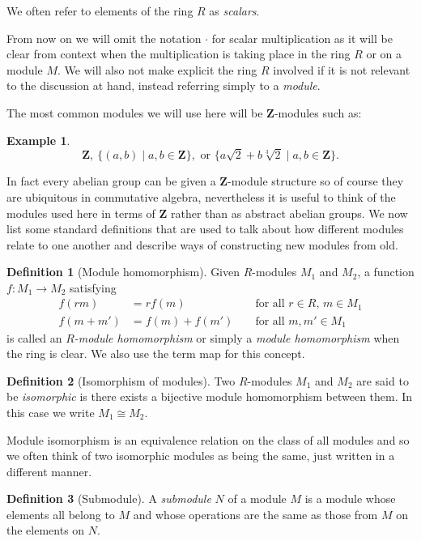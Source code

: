 \documentclass[12pt,a4paper,abstracton,bibtotoc]{scrreprt}
\theoremstyle{definition}
\newtheorem{defn}{Definition}
\newtheorem{ex}{Example}
\newcommand{\ZZ}{\mathbf{Z}}
\begin{document}
We often refer to elements of the ring $R$ as \emph{scalars}.

From now on we will omit the notation $\cdot$ for scalar multiplication as it will be clear from context when the multiplication is taking place in the ring $R$ or on a module $M$.
We will also not make explicit the ring $R$ involved if it is not relevant to the discussion at hand, instead referring simply to a \emph{module}.

The most common modules we will use here will be $\ZZ$-modules such as:
\begin{ex}
\[
\ZZ,\ \{(a,b)\mid a,b\in \ZZ\},\text{ or }\{a\sqrt{2} + b\sqrt[3]{2}\mid a,b\in \ZZ\}.
\]
\end{ex}
In fact every abelian group can be given a $\ZZ$-module structure so of course they are ubiquitous in commutative algebra, nevertheless it is useful to think of the modules used here in terms of $\ZZ$ rather than as abstract abelian groups.
We now list some standard definitions that are used to talk about how different modules relate to one another and describe ways of constructing new modules from old.

\begin{defn}[Module homomorphism]
Given $R$-modules $M_1$ and $M_2$, a function $f\colon M_1 \to M_2$ satisfying
\begin{align*}
f(rm) &= rf(m) &&\text{ for all $r\in R$, $m\in M_1$}\\
f(m + m') &= f(m) + f(m')&&\text{ for all $m,m'\in M_1$}
\end{align*}
is called an \emph{$R$-module homomorphism} or simply a \emph{module homomorphism} when the ring is clear.
We also use the term map for this concept.
\end{defn}

\begin{defn}[Isomorphism of modules]
Two $R$-modules $M_1$ and $M_2$ are said to be \emph{isomorphic} is there exists a bijective module homomorphism between them. 
In this case we write $M_1\cong M_2$.
\end{defn}

Module isomorphism is an equivalence relation on the class of all modules and so we often think of two isomorphic modules as being the same, just written in a different manner.

\begin{defn}[Submodule]
A \emph{submodule} $N$ of a module $M$ is a module whose elements all belong to $M$ and whose operations are the same as those from $M$ on the elements on $N$.
\end{defn}
\end{document}
